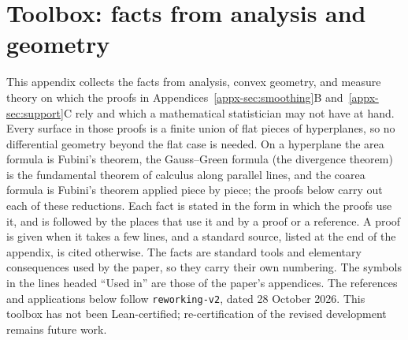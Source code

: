 %   

\makeatletter
\providecommand{\E}{\mathbb E}
\providecommand{\Pp}{\mathbb P}
\providecommand{\R}{\mathbb R}
\providecommand{\tr}{\operatorname{tr}}
\providecommand{\op}{\mathrm{op}}
\providecommand{\norm}[1]{\left\lVert#1\right\rVert}
\providecommand{\ind}{\mathbf 1}
\providecommand{\dd}{\,d}
\providecommand{\Hh}{H_2}
\providecommand{\surf}{\mathcal J}
\providecommand{\relint}{\operatorname{relint}}
\providecommand{\aff}{\operatorname{aff}}
\providecommand{\cone}{\operatorname{cone}}
\providecommand{\dist}{\operatorname{dist}}
\providecommand{\prj}{\operatorname{pr}}
\providecommand{\Haus}{\mathcal H}
\providecommand{\TBc}[1]{[#1]}
\providecommand{\PN}[2]{\ifdefined\toolboxinpaper\ref{#1}\else#2\fi}
\providecommand{\PR}[3]{#1~\PN{#2}{#3}}
\providecommand{\PE}[2]{(\PN{#1}{#2})}
\providecommand{\usedin}[1]{\par\smallskip\noindent{\small\emph{Used in:} #1}\par\smallskip}
\makeatother

\section{Toolbox: facts from analysis and geometry}\label{app:toolbox}

This appendix collects the facts from analysis, convex geometry, and
measure theory on which the proofs in Appendices~\PN{appx-sec:smoothing}{B}
and~\PN{appx-sec:support}{C} rely and which a mathematical statistician may
not have at hand. Every surface in those proofs is a finite union of flat
pieces of hyperplanes, so no differential geometry beyond the flat case is
needed. On a hyperplane the area formula is Fubini's theorem, the
Gauss--Green formula (the divergence theorem) is the fundamental theorem of
calculus along parallel lines, and the coarea formula is Fubini's theorem
applied piece by piece; the proofs below carry out each of these
reductions. Each fact is stated in the form in which
the proofs use it, and is followed by the places that use it and by a proof
or a reference. A proof is given when it takes a few lines, and a standard
source, listed at the end of the appendix, is cited otherwise. The facts are
standard tools and elementary consequences used by the paper, so they
carry their own numbering. The symbols in the lines headed ``Used in'' are those of the
paper's appendices. The references and applications below follow
\texttt{reworking-v2}, dated 28 October 2026. This toolbox has not been
Lean-certified; re-certification of the revised development remains
future work.

